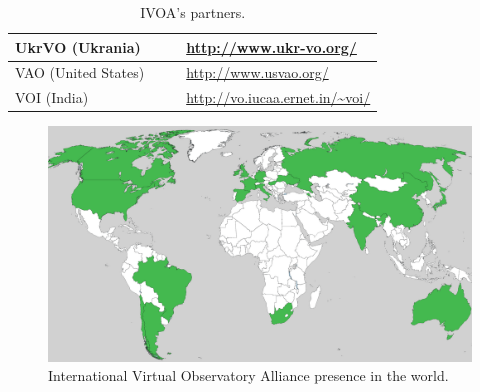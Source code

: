 \begin{table}
\begin{tabular}{|l|l|l|l|}
	\hline
	UkrVO (Ukrania) & & & \url{http://www.ukr-vo.org/} \\
	\hline
	VAO (United States) & & & \url{http://www.usvao.org/} \\
	\hline
	VOI (India) & & & \url{http://vo.iucaa.ernet.in/~voi/} \\
	\hline
\end{tabular}
\caption{IVOA's partners.}
\label{table:partners}
\end{table}

\begin{figure}%
\begin{center}
	\includegraphics[width=0.9\linewidth]{img/VO-worldwide.png}
	\caption{International Virtual Observatory Alliance presence in the world.}
\end{center}
\label{figure:worldview}
\end{figure}


